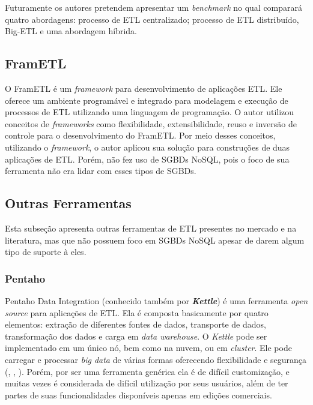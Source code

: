 Futuramente os autores pretendem apresentar um \textit{benchmark} no qual comparará quatro abordagens: processo de ETL centralizado; processo de ETL distribuído, Big-ETL e uma abordagem híbrida.

\subsection{FramETL}

O FramETL é um \textit{framework} para desenvolvimento de aplicações ETL. Ele oferece um ambiente programável e integrado para modelagem e execução de processos de ETL utilizando uma linguagem de programação. O autor utilizou conceitos de \textit{frameworks} como flexibilidade, extensibilidade, reuso e inversão de controle para o desenvolvimento do FramETL. Por meio desses conceitos, utilizando o \textit{framework}, o autor aplicou sua solução para construções de duas aplicações de ETL. Porém, \cite{silva:2012} não fez uso de SGBDs NoSQL, pois o foco de sua ferramenta não era lidar com esses tipos de SGBDs.

\subsection{Outras Ferramentas}

Esta subseção apresenta outras ferramentas de ETL presentes no mercado e na literatura, mas que não possuem foco em SGBDs NoSQL apesar de darem algum tipo de suporte à eles.

\subsubsection{Pentaho}

Pentaho Data Integration (conhecido também por \textit{\textbf{Kettle}}) é uma ferramenta \textit{open source} para aplicações de ETL. Ela é composta basicamente por quatro elementos: extração de diferentes fontes de dados, transporte de dados, transformação dos dados e carga em \textit{data warehouse}. O \textit{Kettle} pode ser implementado em um único nó, bem como na nuvem, ou em \textit{cluster}. Ele pode carregar e processar \textit{big data} de várias formas oferecendo flexibilidade e segurança (\cite{mali:2015}, \cite{ETLtools}, \cite{pentaho}). Porém, por ser uma ferramenta genérica ela é de difícil customização, e muitas vezes é considerada de difícil utilização por seus usuários, além de ter partes de suas funcionalidades disponíveis apenas em edições comerciais.

